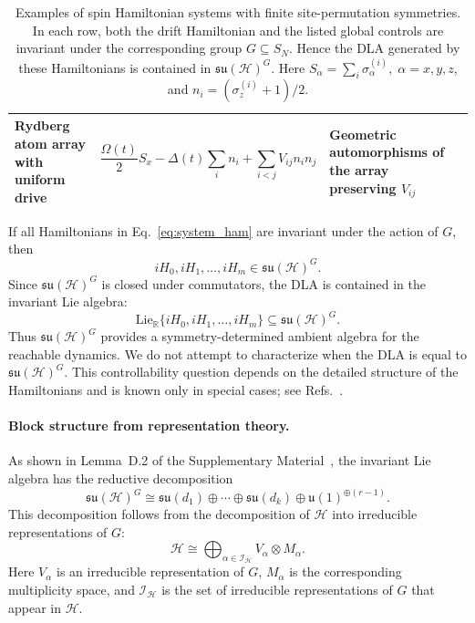 \documentclass[10pt,twocolumn,superscriptaddress,aps,amsmath,amssymb,citeautoscript,floatfix,prx]{revtex4-2}
\newcounter{alg}
\theoremstyle{plain}
\theoremstyle{plain}
\theoremstyle{plain}
\theoremstyle{plain}
\theoremstyle{plain}
\theoremstyle{plain}
\begin{document}
\begin{table}[t]
\begin{tabular}{llll}
\parbox[t]{0.19\textwidth}{Rydberg atom array with uniform drive}
&
\parbox[t]{0.38\textwidth}{
\[
\frac{\Omega(t)}{2}S_x
-\Delta(t)\sum_i n_i
+\sum_{i<j}V_{ij}n_in_j
\]
}
&
\parbox[t]{0.22\textwidth}{
Geometric automorphisms of the array preserving \(V_{ij}\)
}
&
\parbox[t]{0.13\textwidth}{
\cite{Browaeys2020,Daley2022}
}
\\

\hline
\end{tabular}
\caption{
Examples of spin Hamiltonian systems with finite site-permutation symmetries. In each row, both the drift Hamiltonian and the listed global controls are invariant under the corresponding group \(G\subseteq S_N\). Hence the DLA generated by these Hamiltonians is contained in
\(\mathfrak{su}(\mathcal H)^G\). Here $S_{\alpha}=\sum_i \sigma_{\alpha}^{(i)}, \; \alpha=x, y, z$, and $n_i=\left(\sigma_z^{(i)}+1\right) / 2$.
}
\end{table}

If all Hamiltonians in Eq.~\eqref{eq:system_ham} are invariant under the action of $G$, then
$$
iH_0,iH_1,\ldots,iH_m
\in
\mathfrak{su}(\mathcal H)^G .
$$
Since $\mathfrak{su}(\mathcal H)^G$ is closed under commutators, the DLA is contained in the invariant Lie algebra:
$$
\mathrm{Lie}_{\mathbb R}
\{iH_0,iH_1,\ldots,iH_m\}
\subseteq
\mathfrak{su}(\mathcal H)^G .
$$
Thus $\mathfrak{su}(\mathcal H)^G$ provides a symmetry-determined ambient algebra for the reachable dynamics. We do not attempt to characterize when the DLA is equal to $\mathfrak{su}(\mathcal H)^G$. This controllability question depends on the detailed structure of the Hamiltonians and is known only in special cases; see Refs.~\cite{Albertini2020, Kokcu2024, Wiersema2024}.

\paragraph{Block structure from representation theory.}

As shown in Lemma~D.2 of the Supplementary Material~\cite{SuppMat}, the invariant Lie algebra has the reductive decomposition
\begin{equation}\label{eq:inv_alg_decomp}
\mathfrak{su}(\mathcal H)^G
\cong
\mathfrak{su}(d_1)
\oplus
\cdots
\oplus
\mathfrak{su}(d_k)
\oplus
\mathfrak{u}(1)^{\oplus(r-1)} .
\end{equation}
This decomposition follows from the decomposition of $\mathcal H$ into irreducible representations of $G$:
\begin{equation}\label{eq:H_G_irrep_decomp}
\mathcal H
\cong
\bigoplus_{\alpha\in\mathcal I_{\mathcal H}}
V_\alpha\otimes M_\alpha .
\end{equation}
Here $V_\alpha$ is an irreducible representation of $G$, $M_\alpha$ is the corresponding multiplicity space, and $\mathcal I_{\mathcal H}$ is the set of irreducible representations of $G$ that appear in $\mathcal H$.
\end{document}
